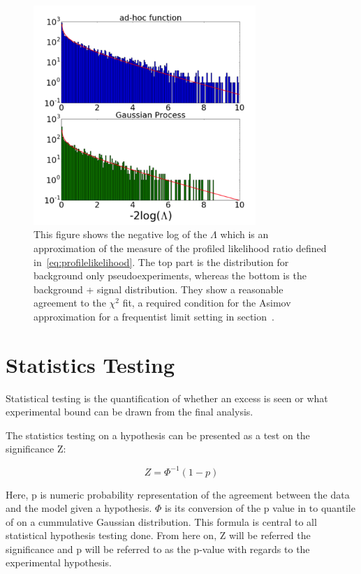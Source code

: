     \begin{figure}[!htb]
        \begin{center}
            \includegraphics[width=0.75\textwidth]{figures/chapter_analysismethod/chi2}
                \caption{
                This figure shows the negative log of the $\Lambda$ which is an approximation of the measure of the profiled likelihood ratio defined in~\ref{eq:profilelikelihood}. The top part is the distribution for background only pseudoexperiments, whereas the bottom is the background + signal distribution. They show a reasonable agreement to the $\chi^{2}$ fit, a required condition for the Asimov approximation for a frequentist limit setting in
            section~\cite{frate2017modelling}. }
            \label{fig:chi2}
        \end{center}
    \end{figure}
    \FloatBarrier

\section{Statistics Testing}
\label{section:stats}
Statistical testing is the quantification of whether an excess is seen or what experimental bound can be drawn from the final analysis. 

The statistics testing on a hypothesis can be presented as a test on the significance Z: 

\begin{equation}
 Z= \Phi^{-1}(1-p) 
 \label{eq:significance}
\end{equation}

Here, p is numeric probability representation of the agreement between the data and the model given a hypothesis. $\Phi$ is its conversion of the p value in to quantile of on a cummulative Gaussian distribution. This formula is central to all statistical hypothesis testing done. From here on, Z will be referred the significance and p will be referred to as the p-value with regards to the experimental hypothesis. 

